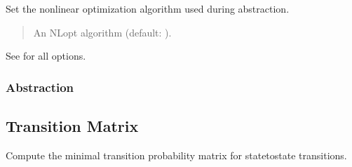 \documentclass[a4paper,10pt,english]{sphinxmanual}
\begin{document}
\begin{fulllineitems}
\begin{fulllineitems}
\label{\detokenize{api/imdp:_CPPv4N4IMDP12setAlgorithmEN5nlopt9algorithmE}}\label{\detokenize{api/imdp:_CPPv3N4IMDP12setAlgorithmEN5nlopt9algorithmE}}\label{\detokenize{api/imdp:_CPPv2N4IMDP12setAlgorithmEN5nlopt9algorithmE}}\label{\detokenize{api/imdp:IMDP::setAlgorithm__nlopt::algorithm}}
\pysigstartsignatures
\pysigstartmultiline
\pysiglinewithargsret
{}
{}
{}
\pysigstopmultiline
\pysigstopsignatures
\sphinxAtStartPar
Set the nonlinear optimization algorithm used during abstraction.
\begin{quote}\begin{description}
\sphinxAtStartPar
{} \textendash{} An NLopt algorithm (default: ).

\end{description}\end{quote}

\sphinxAtStartPar
See 
for all options.

\end{fulllineitems}



\subsubsection{Abstraction}
\label{\detokenize{api/imdp:abstraction}}

\subsection{Transition Matrix}
\label{\detokenize{api/imdp:transition-matrix}}

\begin{fulllineitems}
\label{\detokenize{api/imdp:_CPPv4N4IMDP19minTransitionMatrixEv}}\label{\detokenize{api/imdp:_CPPv3N4IMDP19minTransitionMatrixEv}}\label{\detokenize{api/imdp:_CPPv2N4IMDP19minTransitionMatrixEv}}\label{\detokenize{api/imdp:IMDP::minTransitionMatrix}}
\pysigstartsignatures
\pysigstartmultiline
\pysiglinewithargsret
{}
{}
{}
\pysigstopmultiline
\pysigstopsignatures
\sphinxAtStartPar
Compute the minimal transition probability matrix for state\sphinxhyphen{}to\sphinxhyphen{}state transitions.


\end{fulllineitems}
\end{fulllineitems}
\end{document}
